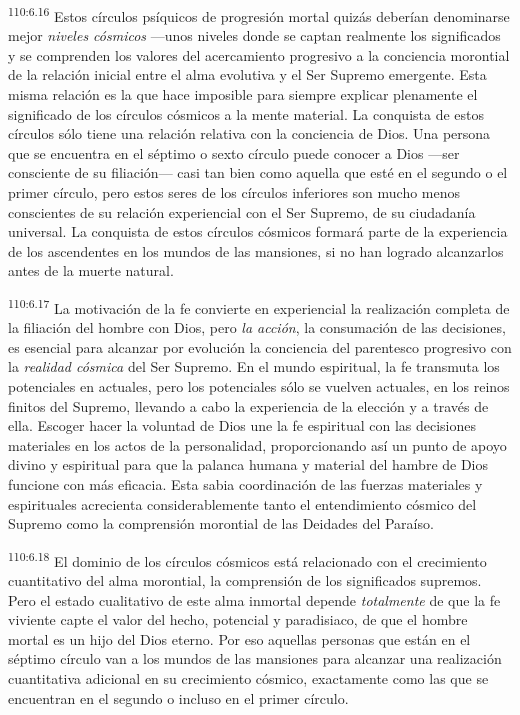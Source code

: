 \documentclass[twoside, 11pt]{book}
\begin{document}
\par
\textsuperscript{110:6.16} Estos círculos psíquicos de progresión mortal quizás deberían denominarse mejor \textit{niveles cósmicos} ---unos niveles donde se captan realmente los significados y se comprenden los valores del acercamiento progresivo a la conciencia morontial de la relación inicial entre el alma evolutiva y el Ser Supremo emergente. Esta misma relación es la que hace imposible para siempre explicar plenamente el significado de los círculos cósmicos a la mente material. La conquista de estos círculos sólo tiene una relación relativa con la conciencia de Dios. Una persona que se encuentra en el séptimo o sexto círculo puede conocer a Dios ---ser consciente de su filiación--- casi tan bien como aquella que esté en el segundo o el primer círculo, pero estos seres de los círculos inferiores son mucho menos conscientes de su relación experiencial con el Ser Supremo, de su ciudadanía universal. La conquista de estos círculos cósmicos formará parte de la experiencia de los ascendentes en los mundos de las mansiones, si no han logrado alcanzarlos antes de la muerte natural.

\par
\textsuperscript{110:6.17} La motivación de la fe convierte en experiencial la realización completa de la filiación del hombre con Dios, pero \textit{la acción}, la consumación de las decisiones, es esencial para alcanzar por evolución la conciencia del parentesco progresivo con la \textit{realidad cósmica} del Ser Supremo. En el mundo espiritual, la fe transmuta los potenciales en actuales, pero los potenciales sólo se vuelven actuales, en los reinos finitos del Supremo, llevando a cabo la experiencia de la elección y a través de ella. Escoger hacer la voluntad de Dios une la fe espiritual con las decisiones materiales en los actos de la personalidad, proporcionando así un punto de apoyo divino y espiritual para que la palanca humana y material del hambre de Dios funcione con más eficacia. Esta sabia coordinación de las fuerzas materiales y espirituales acrecienta considerablemente tanto el entendimiento cósmico del Supremo como la comprensión morontial de las Deidades del Paraíso.

\par
\textsuperscript{110:6.18} El dominio de los círculos cósmicos está relacionado con el crecimiento cuantitativo del alma morontial, la comprensión de los significados supremos. Pero el estado cualitativo de este alma inmortal depende \textit{totalmente} de que la fe viviente capte el valor del hecho, potencial y paradisiaco, de que el hombre mortal es un hijo del Dios eterno. Por eso aquellas personas que están en el séptimo círculo van a los mundos de las mansiones para alcanzar una realización cuantitativa adicional en su crecimiento cósmico, exactamente como las que se encuentran en el segundo o incluso en el primer círculo.
\end{document}
